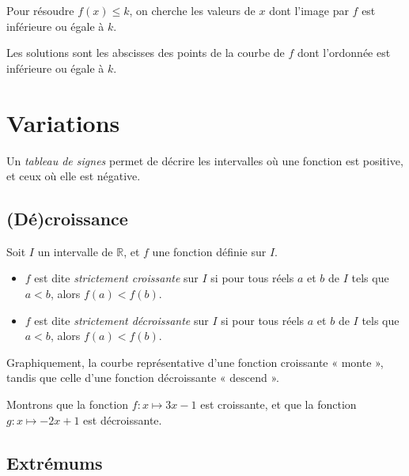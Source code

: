\begin{propriete}
    Pour résoudre $f(x)\leq k$, on cherche les valeurs de $x$ dont l'image par $f$ est inférieure ou égale à $k$.

    Les solutions sont les abscisses des points de la courbe de $f$ dont l'ordonnée est inférieure ou égale à $k$.
\end{propriete}

\section{Variations}

\begin{definition}
  Un \emph{tableau de signes} permet de décrire les intervalles où une fonction est positive, et ceux où elle est négative.
\end{definition}

\subsection{(Dé)croissance}

\begin{definition}
  Soit $I$ un intervalle de $\mathbb R$, et $f$ une fonction définie sur $I$.
  \begin{itemize}
    \item $f$ est dite \emph{strictement   croissante} sur $I$ si pour tous
      réels $a$ et $b$ de $I$ tels que $a<b$, alors $f(a)<f(b)$.
    \item $f$ est dite \emph{strictement décroissante} sur $I$ si pour tous
      réels $a$ et $b$ de $I$ tels que $a<b$, alors $f(a)<f(b)$.
  \end{itemize}
\end{definition}

\begin{remarque}
  Graphiquement, la courbe représentative d'une fonction croissante
  « monte », tandis que celle d'une fonction décroissante « descend ».
\end{remarque}

\begin{exemple}
  Montrons que la fonction $f:x\mapsto 3x-1$ est croissante, et que la fonction
  $g:x\mapsto -2x+1$ est décroissante.
\end{exemple}

\subsection{Extrémums}

